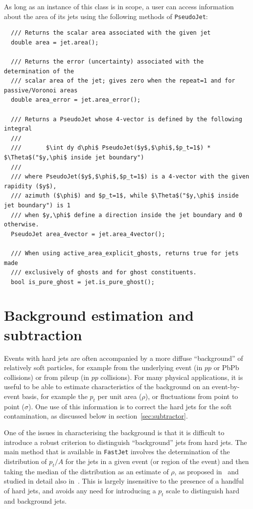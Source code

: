 \documentclass[12pt,a4]{article}
\newcommand{\fastjet}{\texttt{FastJet}\xspace}
\newcommand{\ttt}[1]{{\small\texttt{#1}}}
\begin{document}
As long as an instance of this class is in scope, a user can access
information about the area of its jets using the following methods of
\ttt{PseudoJet}:
\begin{lstlisting}
  /// Returns the scalar area associated with the given jet
  double area = jet.area();

  /// Returns the error (uncertainty) associated with the determination of the
  /// scalar area of the jet; gives zero when the repeat=1 and for passive/Voronoi areas
  double area_error = jet.area_error();

  /// Returns a PseudoJet whose 4-vector is defined by the following integral
  ///
  ///       $\int dy d\phi$ PseudoJet($y$,$\phi$,$p_t=1$) * $\Theta$("$y,\phi$ inside jet boundary")
  ///
  /// where PseudoJet($y$,$\phi$,$p_t=1$) is a 4-vector with the given rapidity ($y$),
  /// azimuth ($\phi$) and $p_t=1$, while $\Theta$("$y,\phi$ inside jet boundary") is 1 
  /// when $y,\phi$ define a direction inside the jet boundary and 0 otherwise.
  PseudoJet area_4vector = jet.area_4vector();

  /// When using active_area_explicit_ghosts, returns true for jets made 
  /// exclusively of ghosts and for ghost constituents.
  bool is_pure_ghost = jet.is_pure_ghost();
\end{lstlisting}

\section{Background estimation and subtraction}
\label{sec:BackgroundEstimator}

Events with hard jets are often accompanied by a more diffuse
``background'' of relatively soft particles, for example from the
underlying event (in $pp$ or PbPb collisions) or from pileup (in $pp$
collisions).
%
For many physical applications, it is useful to be able to
estimate characteristics of the background on an event-by-event basis,
for example the $p_t$ per unit area ($\rho$), or fluctuations from
point to point ($\sigma$).
%
One use of this information is to correct the hard jets for the soft
contamination, as discussed below in section~\ref{sec:subtractor}.

One of the issues in characterising the background is that it is
difficult to introduce a robust criterion to distinguish
``background'' jets from hard jets.
%
The main method that is available in \fastjet involves the
determination of the distribution of $p_t/A$ for the jets in a given
event (or region of the event) and then taking the median of the
distribution as an estimate of $\rho$, as proposed in~\cite{cs} and
studied in detail also in~\cite{Cacciari:2009dp,GridMedianLH}.
%
This is largely insensitive to the presence of a handful of hard jets, and
avoids any need for introducing a $p_t$ scale to distinguish hard and
background jets.
\end{document}
